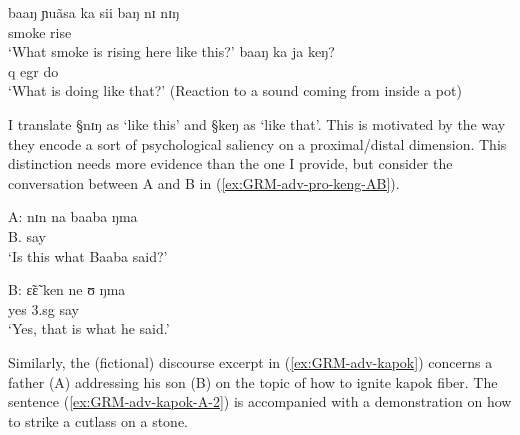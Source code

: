 \begin{exe}
\ex\label{ex:GRM-adv-pro-keng-ning}
 \begin{xlist}
 
 \ex\label{ex:GRM-adv-pro-ning}
\gll baaŋ ɲuãsa ka sii baŋ nɪ nɪŋ\\
{\q}  smoke  {\egr} rise {\advl} {\postp} {\advm}\\
\glt `What smoke is rising here like this?'  
  \ex\label{ex:GRM-adv-pro-keng}
 \gll baaŋ ka ja keŋ?\\
  {\sc q} {\sc egr} do  {\advm}\\ 
 \glt `What is doing like that?' (Reaction to a sound coming from inside a pot)
 
 \end{xlist}
\end{exe}   


I translate {\S nɪŋ} as `like this' and {\S keŋ} as `like that'. This is
motivated by the way they  encode a sort of psychological saliency on a
proximal/distal dimension. This distinction needs more evidence than the one I
provide,  but consider the conversation between A and B in
(\ref{ex:GRM-adv-pro-keng-AB}). 


\begin{exe}
\ex\label{ex:GRM-adv-pro-keng-AB}
 \begin{xlist}
 
 \ex\label{ex:GRM-adv-pro-A}
\gll A: nɪn na baaba ŋma\\
 {} {\advm} {\foc} B. say\\
\glt `Is this what Baaba said?'

  \ex\label{ex:GRM-adv-pro-B}
 \gll B: ɛ̃ɛ̃ ken ne ʊ ŋma\\
 {} yes {\advm} {\foc} {\sc 3.sg} say\\
\glt `Yes, that is what he said.'
 
 \end{xlist}
\end{exe}   

Similarly,  the (fictional) discourse excerpt in
(\ref{ex:GRM-adv-kapok}) concerns a father (A) addressing his son (B) on the
topic of  how to ignite kapok fiber. The sentence (\ref{ex:GRM-adv-kapok-A-2})
is accompanied with a demonstration on how to strike a cutlass on a stone.


